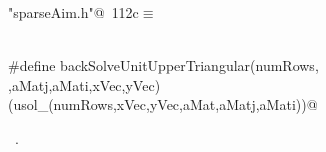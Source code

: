 \documentclass{article}
\begin{document}
\begin{description}
\begin{flushleft}
\begin{minipage}{\linewidth}
\begin{list}{}{\setlength{\itemsep}{-\parsep}\setlength{\itemindent}{-\leftmargin}}
\item{}
\end{list}
\end{minipage}\vspace{4ex}
\end{flushleft}
\item[ unit upper triangular solve] 
\begin{flushleft} \small
\begin{minipage}{\linewidth}\label{scrap198}\raggedright\small
{} \verb@"sparseAim.h"@\nobreak\ {\footnotesize {112c}}$\equiv$
\vspace{-1ex}
\begin{list}{}{} \item
\mbox{}\verb@@\\
\mbox{}\verb@#define backSolveUnitUpperTriangular(numRows, \@\\
\mbox{}\verb@aMat,aMatj,aMati,xVec,yVec) \@\\
\mbox{}\verb@(usol_(numRows,xVec,yVec,aMat,aMatj,aMati))@\\
\mbox{}\verb@@{\NWsep}
\end{list}
\vspace{-1.5ex}
\footnotesize
\begin{list}{}{\setlength{\itemsep}{-\parsep}\setlength{\itemindent}{-\leftmargin}}
\item \NWtxtFileDefBy\ .


\end{list}
\end{minipage}
\end{flushleft}
\end{description}
\end{document}
